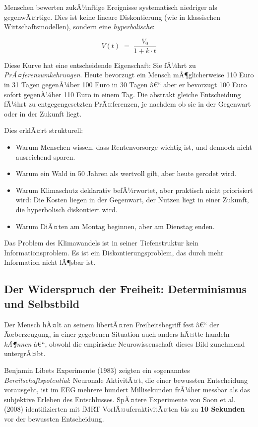 ﻿\documentclass[12pt, a4paper]{article}
\begin{document}
Menschen bewerten zukÃ¼nftige Ereignisse systematisch niedriger als
gegenwÃ¤rtige. Dies ist keine lineare Diskontierung (wie in klassischen
Wirtschaftsmodellen), sondern eine \emph{hyperbolische}:

\begin{equation}
  V(t) \;=\; \frac{V_0}{1 + k \cdot t}
\end{equation}

Diese Kurve hat eine entscheidende Eigenschaft: Sie fÃ¼hrt zu \emph{PrÃ¤ferenzumkehrungen}.
Heute bevorzugt ein Mensch mÃ¶glicherweise 110 Euro in 31 Tagen gegenÃ¼ber 100 Euro
in 30 Tagen â€“ aber er bevorzugt 100 Euro sofort gegenÃ¼ber 110 Euro in einem Tag.
Die abstrakt gleiche Entscheidung fÃ¼hrt zu entgegengesetzten PrÃ¤ferenzen, je
nachdem ob sie in der Gegenwart oder in der Zukunft liegt.

Dies erklÃ¤rt strukturell:
\begin{itemize}
  \item Warum Menschen wissen, dass Rentenvorsorge wichtig ist, und dennoch nicht
    ausreichend sparen.
  \item Warum ein Wald in 50 Jahren als wertvoll gilt, aber heute gerodet wird.
  \item Warum Klimaschutz deklarativ befÃ¼rwortet, aber praktisch nicht priorisiert
    wird: Die Kosten liegen in der Gegenwart, der Nutzen liegt in einer Zukunft,
    die hyperbolisch diskontiert wird.
  \item Warum DiÃ¤ten am Montag beginnen, aber am Dienstag enden.
\end{itemize}

Das Problem des Klimawandels ist in seiner Tiefenstruktur kein Infor\-mations\-problem.
Es ist ein Dis\-kon\-tierungs\-problem, das durch mehr Information nicht lÃ¶sbar ist.

\subsection{Der Widerspruch der Freiheit: Determinismus und Selbstbild}

Der Mensch hÃ¤lt an seinem libertÃ¤ren Freiheitsbegriff fest â€“ der Ãœberzeugung,
in einer gegebenen Situation auch anders hÃ¤tte handeln \emph{kÃ¶nnen} â€“, obwohl
die empirische Neurowissenschaft dieses Bild zunehmend untergrÃ¤bt.

Benjamin Libets Experimente (1983) zeigten ein sogenanntes \emph{Bereitschaftspotential}:
Neuronale AktivitÃ¤t, die einer bewussten Entscheidung vorausgeht, ist im EEG
mehrere hundert Millisekunden frÃ¼her messbar als das subjektive Erleben des
Entschlusses. SpÃ¤tere Experimente von Soon et al. (2008) identifizierten mit
fMRT VorlÃ¤uferaktivitÃ¤ten bis zu \textbf{10 Sekunden} vor der bewussten
Entscheidung.
\end{document}
